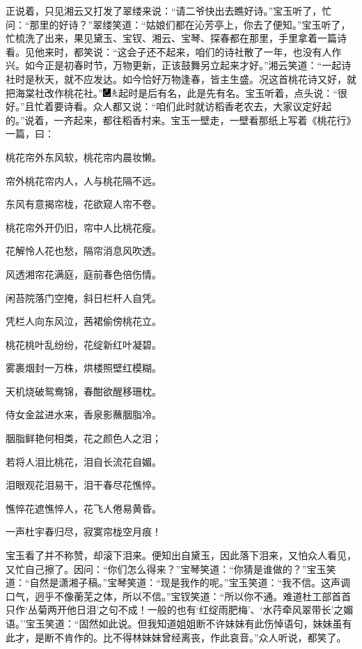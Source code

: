 正说着，只见湘云又打发了翠缕来说：``请二爷快出去瞧好诗。''宝玉听了，忙问：``那里的好诗？''翠缕笑道：``姑娘们都在沁芳亭上，你去了便知。''宝玉听了，忙梳洗了出来，果见黛玉、宝钗、湘云、宝琴、探春都在那里，手里拿着一篇诗看。见他来时，都笑说：``这会子还不起来，咱们的诗社散了一年，也没有人作兴。如今正是初春时节，万物更新，正该鼓舞另立起来才好。''湘云笑道：``一起诗社时是秋天，就不应发达。如今恰好万物逢春，皆主生盛。况这首桃花诗又好，就把海棠社改作桃花社。''{\includegraphics[width=3mm]{../Images/00003}\includegraphics[width=3mm]{../Images/00012}\footnotesize \kaishu 起时是后有名，此是先有名。}宝玉听着，点头说：``很好。''且忙着要诗看。众人都又说：``咱们此时就访稻香老农去，大家议定好起的。''说着，一齐起来，都往稻香村来。宝玉一壁走，一壁看那纸上写着《桃花行》一篇，曰：

桃花帘外东风软，桃花帘内晨妆懒。

帘外桃花帘内人，人与桃花隔不远。

东风有意揭帘栊，花欲窥人帘不卷。

桃花帘外开仍旧，帘中人比桃花瘦。

花解怜人花也愁，隔帘消息风吹透。

风透湘帘花满庭，庭前春色倍伤情。

闲苔院落门空掩，斜日栏杆人自凭。

凭栏人向东风泣，茜裙偷傍桃花立。

桃花桃叶乱纷纷，花绽新红叶凝碧。

雾裹烟封一万株，烘楼照壁红模糊。

天机烧破鸳鸯锦，春酣欲醒移珊枕。

侍女金盆进水来，香泉影蘸胭脂冷。

胭脂鲜艳何相类，花之颜色人之泪；

若将人泪比桃花，泪自长流花自媚。

泪眼观花泪易干，泪干春尽花憔悴。

憔悴花遮憔悴人，花飞人倦易黄昏。

一声杜宇春归尽，寂寞帘栊空月痕！

宝玉看了并不称赞，却滚下泪来。便知出自黛玉，因此落下泪来，又怕众人看见，又忙自己擦了。因问：``你们怎么得来？''宝琴笑道：``你猜是谁做的？''宝玉笑道：``自然是潇湘子稿。''宝琴笑道：``现是我作的呢。''宝玉笑道：``我不信。这声调口气，迥乎不像蘅芜之体，所以不信。''宝钗笑道：``所以你不通。难道杜工部首首只作`丛菊两开他日泪'之句不成！一般的也有`红绽雨肥梅'、`水荇牵风翠带长'之媚语。''宝玉笑道：``固然如此说。但我知道姐姐断不许妹妹有此伤悼语句，妹妹虽有此才，是断不肯作的。比不得林妹妹曾经离丧，作此哀音。''众人听说，都笑了。

